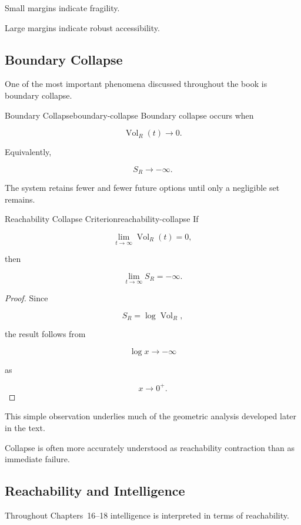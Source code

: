 \documentclass[12pt,twoside,openright]{book}
\newcommand{\Vol}{\operatorname{Vol}}
\begin{document}
Small margins indicate fragility.

Large margins indicate robust accessibility.

\subsection{Boundary Collapse}

One of the most important phenomena discussed throughout
the book is boundary collapse.

\begin{definition}{Boundary Collapse}{boundary-collapse}
Boundary collapse occurs when

\[
\Vol_R(t)
\rightarrow0.
\]
\end{definition}

Equivalently,

\[
S_R
\rightarrow
-\infty.
\]

The system retains fewer and fewer future options until
only a negligible set remains.

\begin{theorem}{Reachability Collapse Criterion}{reachability-collapse}
If

\[
\lim_{t\to\infty}
\Vol_R(t)
=

0,
\]

then

\[
\lim_{t\to\infty}
S_R
=

-\infty.
\]
\end{theorem}

\begin{proof}
Since

\[
S_R
=

\log\Vol_R,
\]

the result follows from

\[
\log x
\rightarrow
-\infty
\]

as

\[
x\rightarrow0^+.
\]
\end{proof}

This simple observation underlies much of the geometric
analysis developed later in the text.

Collapse is often more accurately understood as
reachability contraction than as immediate failure.

\subsection{Reachability and Intelligence}

Throughout Chapters~16--18 intelligence is interpreted in
terms of reachability.
\end{document}
